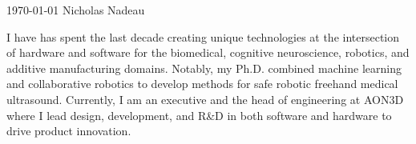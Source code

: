 \documentclass[11pt, letterpaper]{awesome-cv}
\begin{document}
\makecvheader[R]

\makecvfooter
{\today}
{Nicholas Nadeau}
{}

\makelettertitle


\begin{cvletter}


    I have has spent the last decade creating unique technologies at the intersection of hardware and software for the biomedical, cognitive neuroscience, robotics, and additive manufacturing domains.
    Notably, my Ph.D. combined machine learning and collaborative robotics to develop methods for safe robotic freehand medical ultrasound.
    Currently, I am an executive and the head of engineering at AON3D where I lead design, development, and R&D in both software and hardware to drive product innovation.



\end{cvletter}

\makeletterclosing
\end{document}
